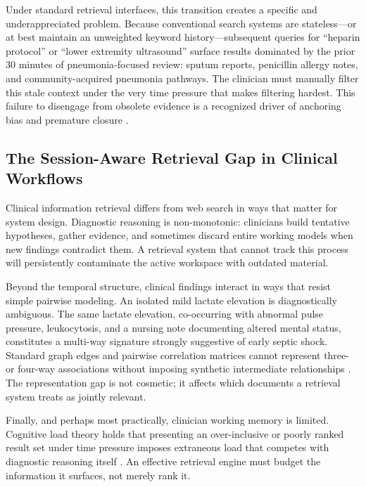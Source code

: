 \documentclass[10pt, onecolumn]{article}
\begin{document}
Under standard retrieval interfaces, this transition creates a specific and underappreciated problem. Because conventional search systems are stateless---or at best maintain an unweighted keyword history---subsequent queries for ``heparin protocol'' or ``lower extremity ultrasound'' surface results dominated by the prior 30 minutes of pneumonia-focused review: sputum reports, penicillin allergy notes, and community-acquired pneumonia pathways. The clinician must manually filter this stale context under the very time pressure that makes filtering hardest. This failure to disengage from obsolete evidence is a recognized driver of anchoring bias and premature closure \cite{croskerry2002achieving,goddard2012automation}.

\subsection{The Session-Aware Retrieval Gap in Clinical Workflows}

Clinical information retrieval differs from web search in ways that matter for system design. Diagnostic reasoning is non-monotonic: clinicians build tentative hypotheses, gather evidence, and sometimes discard entire working models when new findings contradict them. A retrieval system that cannot track this process will persistently contaminate the active workspace with outdated material.

Beyond the temporal structure, clinical findings interact in ways that resist simple pairwise modeling. An isolated mild lactate elevation is diagnostically ambiguous. The same lactate elevation, co-occurring with abnormal pulse pressure, leukocytosis, and a nursing note documenting altered mental status, constitutes a multi-way signature strongly suggestive of early septic shock. Standard graph edges and pairwise correlation matrices cannot represent three- or four-way associations without imposing synthetic intermediate relationships \cite{feng2019hypergraph,zhou2006learning}. The representation gap is not cosmetic; it affects which documents a retrieval system treats as jointly relevant.

Finally, and perhaps most practically, clinician working memory is limited. Cognitive load theory holds that presenting an over-inclusive or poorly ranked result set under time pressure imposes extraneous load that competes with diagnostic reasoning itself \cite{sweller1988cognitive,miller1956magical}. An effective retrieval engine must budget the information it surfaces, not merely rank it.
\end{document}
